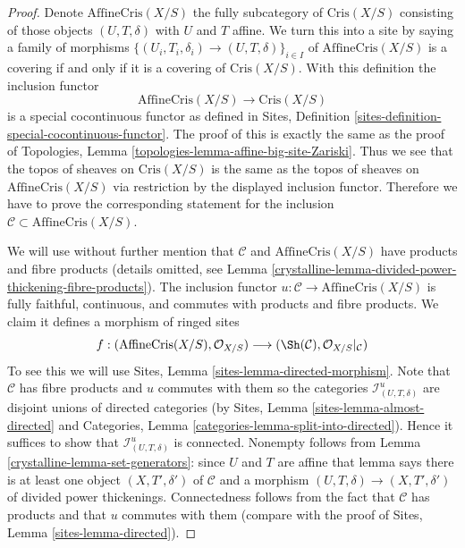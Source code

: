 \begin{proof}

Denote $\text{AffineCris}(X/S)$ the fully subcategory of $\text{Cris}(X/S)$
consisting of those objects $(U, T, \delta)$ with $U$ and $T$ affine.
We turn this into a site by saying a family of morphisms
$\{(U_i, T_i, \delta_i) \to (U, T, \delta)\}_{i \in I}$ of
$\text{AffineCris}(X/S)$ is a covering if and only if it is a covering
of $\text{Cris}(X/S)$. With this definition the inclusion functor
$$
\text{AffineCris}(X/S) \longrightarrow \text{Cris}(X/S)
$$
is a special cocontinuous functor as defined in
Sites, Definition \ref{sites-definition-special-cocontinuous-functor}.
The proof of this is exactly the same as the proof of
Topologies, Lemma \ref{topologies-lemma-affine-big-site-Zariski}.
Thus we see that the topos of sheaves on $\text{Cris}(X/S)$
is the same as the topos of sheaves on $\text{AffineCris}(X/S)$
via restriction by the displayed inclusion functor.
Therefore we have to prove the corresponding statement for the
inclusion $\mathcal{C} \subset \text{AffineCris}(X/S)$.

\medskip\noindent
We will use without further mention that $\mathcal{C}$ and
$\text{AffineCris}(X/S)$ have products and fibre products
(details omitted, see
Lemma \ref{crystalline-lemma-divided-power-thickening-fibre-products}).
The inclusion functor $u : \mathcal{C} \to \text{AffineCris}(X/S)$
is fully faithful, continuous, and commutes with products and fibre products.
We claim it defines a morphism of ringed sites
$$
f :
(\text{AffineCris}(X/S), \mathcal{O}_{X/S})
\longrightarrow
(\Sh(\mathcal{C}), \mathcal{O}_{X/S}|_\mathcal{C})
$$
To see this we will use Sites, Lemma \ref{sites-lemma-directed-morphism}.
Note that $\mathcal{C}$ has fibre products and $u$ commutes with them
so the categories $\mathcal{I}^u_{(U, T, \delta)}$ are disjoint unions
of directed categories (by Sites, Lemma \ref{sites-lemma-almost-directed} and
Categories, Lemma \ref{categories-lemma-split-into-directed}). Hence it
suffices to show that $\mathcal{I}^u_{(U, T, \delta)}$ is connected.
Nonempty follows from Lemma \ref{crystalline-lemma-set-generators}: since $U$ and $T$
are affine that lemma says there is at least one object
$(X, T', \delta')$ of $\mathcal{C}$ and a morphism
$(U, T, \delta) \to (X, T', \delta')$ of divided power thickenings.
Connectedness follows from the fact that $\mathcal{C}$ has products
and that $u$ commutes with them (compare with the proof of
Sites, Lemma \ref{sites-lemma-directed}).


\end{proof}
